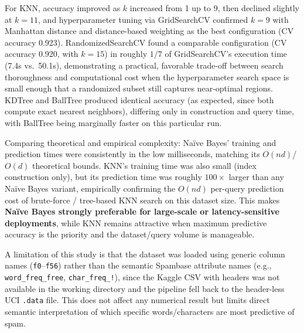 \documentclass[12pt,a4paper]{article}
\begin{document}
For KNN, accuracy improved as $k$ increased from 1 up to 9, then declined slightly at
$k=11$, and hyperparameter tuning via GridSearchCV confirmed $k=9$ with Manhattan
distance and distance-based weighting as the best configuration (CV accuracy 0.923).
RandomizedSearchCV found a comparable configuration (CV accuracy 0.920, with $k=15$)
in roughly $1/7$ of GridSearchCV's execution time (7.4s vs.\ 50.1s), demonstrating a
practical, favorable trade-off between search thoroughness and computational cost when
the hyperparameter search space is small enough that a randomized subset still
captures near-optimal regions. KDTree and BallTree produced identical accuracy (as
expected, since both compute exact nearest neighbors), differing only in construction
and query time, with BallTree being marginally faster on this particular run.

Comparing theoretical and empirical complexity: Na\"ive Bayes' training and prediction
times were consistently in the low milliseconds, matching its $O(nd)$/$O(d)$
theoretical bounds. KNN's training time was also small (index construction only), but
its prediction time was roughly $100\times$ larger than any Na\"ive Bayes variant,
empirically confirming the $O(nd)$ per-query prediction cost of brute-force /
tree-based KNN search on this dataset size. This makes \textbf{Na\"ive Bayes strongly
preferable for large-scale or latency-sensitive deployments}, while KNN remains
attractive when maximum predictive accuracy is the priority and the dataset/query
volume is manageable.

A limitation of this study is that the dataset was loaded using generic column names
(\texttt{f0}--\texttt{f56}) rather than the semantic Spambase attribute names (e.g.,
\texttt{word\_freq\_free}, \texttt{char\_freq\_!}), since the Kaggle CSV with headers
was not available in the working directory and the pipeline fell back to the
header-less UCI \texttt{.data} file. This does not affect any numerical result but
limits direct semantic interpretation of which specific words/characters are most
predictive of spam.
\end{document}
